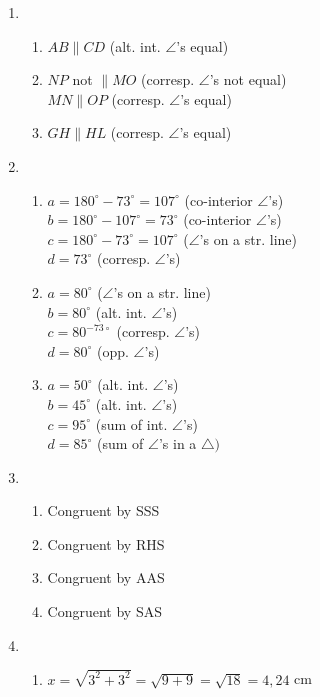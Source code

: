 \begin{eocsolutions}{}
{\begin{enumerate}[itemsep=5pt, label=\textbf{\arabic*}. ]
\item %
	  \begin{enumerate}[noitemsep, label=\textbf{(\alph*)} ]
		\item $AB \parallel CD$ (alt. int. $\angle$'s equal)
		\item $NP$ not $\parallel MO$ (corresp. $\angle$'s not equal)\\
$MN \parallel OP$ (corresp. $\angle$'s equal)
		\item $GH \parallel HL$ (corresp. $\angle$'s equal)
	  \end{enumerate}
\item 
\begin{enumerate}[noitemsep, label=\textbf{(\alph*)} ]
		\item $a=180^{\circ} -73^{\circ}=107^{\circ}$ (co-interior $\angle$'s)\\
$ b=180^{\circ} -107^{\circ}=73^{\circ}$ (co-interior $\angle$'s)\\

 $c=180^{\circ} -73^{\circ}=107^{\circ}$ ($\angle$'s on a str. line)\\
$d=73^{\circ}$ (corresp. $\angle$'s)
\item $a=80^{\circ}$ ($\angle$'s on a str. line)\\
 $b=80^{\circ}$ (alt. int. $\angle$'s)\\
 $c=80^{-73\circ}$ (corresp. $\angle$'s)\\
 $d=80^{\circ}$ (opp. $\angle$'s)
\item $a=50^{\circ}$ (alt. int. $\angle$'s)\\
 $ b=45^{\circ}$ (alt. int. $\angle$'s)\\
 $c=95^{\circ}$ (sum of int. $\angle$'s)\\
 $ d=85^{\circ}$ (sum of $\angle$'s in a $\triangle)$
	  \end{enumerate}
\item 
  \begin{enumerate}[noitemsep, label=\textbf{(\alph*)} ]
		\item Congruent by SSS%
		\item Congruent by RHS%
		\item  Congruent by AAS%
		\item Congruent by SAS
	  \end{enumerate}

\item 	  \begin{enumerate}[noitemsep, label=\textbf{(\alph*)} ]
	\item $x=\sqrt{3^2+3^2} = \sqrt{9+9} =\sqrt{18} =4,24$ cm%


\end{enumerate}
\end{enumerate}}
\end{eocsolutions}
